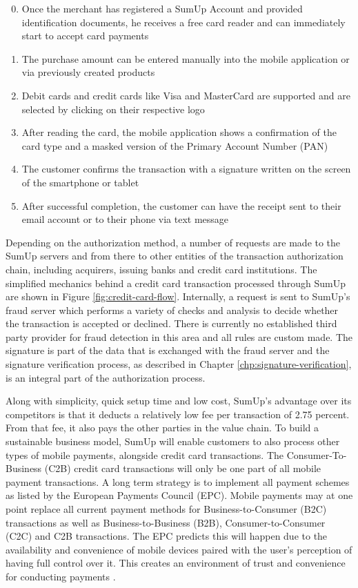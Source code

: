 \documentclass[a4paper, oneside]{csthesis}
\begin{document}
\begin{enumerate}
\setcounter{enumi}{-1}
    \item Once the merchant has registered a SumUp Account and provided identification documents, he receives a free card reader and can immediately start to accept card payments
    \item The purchase amount can be entered manually into the mobile application or via previously created products
    \item Debit cards and credit cards like Visa and MasterCard are supported and are selected by clicking on their respective logo
    \item After reading the card, the mobile application shows a confirmation of the card type and a masked version of the Primary Account Number (PAN)
    \item The customer confirms the transaction with a signature written on the screen of the smartphone or tablet
    \item After successful completion, the customer can have the receipt sent to their email account or to their phone via text message
\end{enumerate}


Depending on the authorization method, a number of requests are made to the SumUp servers and from there to other entities of the transaction authorization chain, including acquirers, issuing banks and credit card institutions. The simplified mechanics behind a credit card transaction processed through SumUp are shown in Figure \ref{fig:credit-card-flow}.  Internally, a request is sent to SumUp's fraud server which performs a variety of checks and analysis to decide whether the transaction is accepted or declined. There is currently no established third party provider for fraud detection in this area and all rules are custom made. The signature is part of the data that is exchanged with the fraud server and the signature verification process, as described in Chapter \ref{chp:signature-verification}, is an integral part of the  authorization process.


Along with simplicity, quick setup time and low cost, SumUp's advantage over its competitors is that it deducts a relatively low fee per transaction of 2.75 percent. From that fee, it also pays the other parties in the value chain. To build a sustainable business model, SumUp will enable customers to also process other types of mobile payments, alongside credit card transactions. The Consumer-To-Business (C2B) credit card transactions will only be one part of all mobile payment transactions. A long term strategy is to implement all payment schemes as listed by the European Payments Council (EPC). Mobile payments may at one point replace all current payment methods for Business-to-Consumer (B2C) transactions as well as Business-to-Business (B2B), Consumer-to-Consumer (C2C) and C2B transactions. The EPC predicts this will happen due to the availability and convenience of mobile devices paired with the user's perception of having full control over it. This creates an environment of trust and convenience for conducting payments \cite{mpwhitepaper}.
\end{document}
